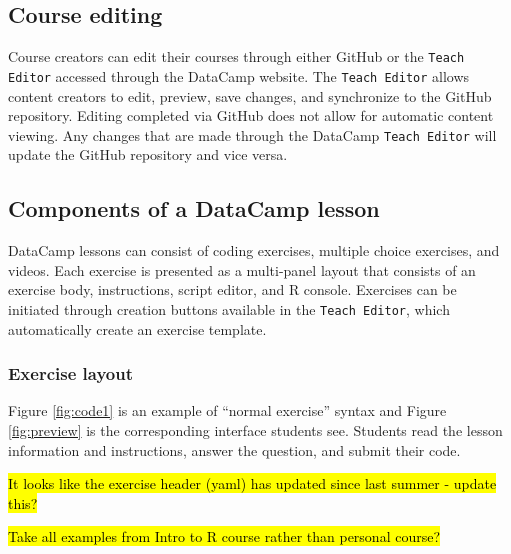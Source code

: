\documentclass{tise_style_doi}
\begin{document}
\subsection{Course editing}

Course creators can edit their courses through either GitHub or the \texttt{Teach Editor}
accessed through the DataCamp website. The \texttt{Teach Editor} allows content
creators to edit, preview, save changes, and synchronize to the GitHub repository.
Editing completed via GitHub does not allow for automatic content viewing. Any changes
that are made through the DataCamp \texttt{Teach Editor} will update the GitHub
repository and vice versa.

\subsection{Components of a DataCamp lesson}

DataCamp lessons can consist of coding exercises, multiple choice exercises, 
and videos.  Each exercise is presented as a multi-panel layout that consists
of an exercise body, instructions, script editor, and R console.  Exercises
can be initiated through creation buttons available in the \texttt{Teach Editor},
which automatically create an exercise template. 

\subsubsection{Exercise layout}

Figure \ref{fig:code1} is an example of ``normal exercise'' syntax and Figure 
\ref{fig:preview} is the corresponding interface students see. Students read the 
lesson information and instructions, answer the question, and submit their code.

\hl{It looks like the exercise header (yaml) has updated since last summer - update this?}

\hl{Take all examples from Intro to R course rather than personal course?}
\end{document}
